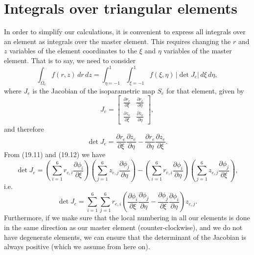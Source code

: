 \documentclass{article}
\begin{document}
\section{Integrals over triangular elements}
In order to simplify our calculations, it is convenient to express all integrals over an element as integrals over the master element. This requires changing the \(r\) and \(z\) variables of the element coordinates to the \(\xi\) and \(\eta\) variables of the master element. That is to say, we need to consider
\begin{equation}
\int_{\Omega_e} f(r,z) \, dr\,dz = \int_{\eta=-1}^{1} \int_{\xi=-1}^{1} f(\xi,\eta) \, |\det J_e| \, d\xi\, d\eta, \tag{20.1}
\end{equation}
where \(J_e\) is the Jacobian of the isoparametric map \(S_e\) for that element, given by
\begin{equation}
J_e = \begin{bmatrix}
\frac{\partial r_e}{\partial \xi} & \frac{\partial r_e}{\partial \eta} \\[4pt]
\frac{\partial z_e}{\partial \xi} & \frac{\partial z_e}{\partial \eta}
\end{bmatrix}, \tag{20.2}
\end{equation}
and therefore
\begin{equation}
\det J_e = \frac{\partial r_e}{\partial \xi} \frac{\partial z_e}{\partial \eta} - \frac{\partial r_e}{\partial \eta} \frac{\partial z_e}{\partial \xi}. \tag{20.3}
\end{equation}
From (19.11) and (19.12) we have
\begin{equation}
\det J_e = \left(\sum_{i=1}^6 r_{e,i} \frac{\partial \phi_i}{\partial \xi}\right) \left(\sum_{j=1}^6 z_{e,j} \frac{\partial \phi_j}{\partial \eta}\right) - \left(\sum_{i=1}^6 r_{e,i} \frac{\partial \phi_i}{\partial \eta}\right) \left(\sum_{j=1}^6 z_{e,j} \frac{\partial \phi_j}{\partial \xi}\right), \tag{20.4}
\end{equation}
i.e.
\begin{equation}
\det J_e = \sum_{i=1}^6 \sum_{j=1}^6 r_{e,i} \left( \frac{\partial \phi_i}{\partial \xi} \frac{\partial \phi_j}{\partial \eta} - \frac{\partial \phi_j}{\partial \xi} \frac{\partial \phi_i}{\partial \eta} \right) z_{e,j}. \tag{20.6}
\end{equation}
Furthermore, if we make sure that the local numbering in all our elements is done in the same direction as our master element (counter-clockwise), and we do not have degenerate elements, we can ensure that the determinant of the Jacobian is always positive (which we assume from here on).
\end{document}
